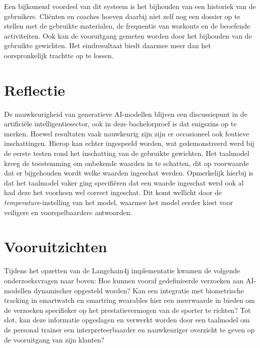 Een bijkomend voordeel van dit systeem is het bijhouden van een historiek van de gebruikers.
Cliënten en coaches hoeven daarbij niet zelf nog een dossier op te stellen met de gebruikte materialen, de frequentie van workouts en de beoefende activiteiten.
Ook kan de vooruitgang gemeten worden door het bijhouden van de gebruikte gewichten.
Het eindresultaat biedt daarmee meer dan het oorspronkelijk trachtte op te lossen.

\section{Reflectie}
\label{sec:reflectie}
De nauwkeurigheid van generatieve AI-modellen blijven een discussiepunt in de artificiële intelligentiesector, ook in deze bachelorproef is dat enigszins op te merken.
Hoewel resultaten vaak nauwkeurig zijn zijn er occasioneel ook foutieve inschattingen.
Hierop kan echter ingespeeld worden, wat gedemonstreerd werd bij de eerste testen rond het inschatting van de gebruikte gewichten.
Het taalmodel kreeg de toestemming om onbekende waarden in te schatten, dit op voorwaarde dat er bijgehouden wordt welke waarden ingeschat werden.
Opmerkelijk hierbij is dat het taalmodel vaker ging specifiëren dat een waarde ingeschat werd ook al had deze het voorheen wel correct ingeschat.
Dit komt wellicht door de \textit{temperature}-instelling van het model, waarmee het model eerder kiest voor veiligere en voorspelbaardere antwoorden.

\section{Vooruitzichten}
\label{sec:vooruitzichten}
Tijdens het opzetten van de Langchain4j implementatie kwamen de volgende onderzoeksvragen naar boven:
Hoe kunnen vooraf gedefinieerde verzoeken aan AI-modellen dynamischer opgesteld worden?
Kan een integratie met biometrische tracking in smartwatch en smartring wearables hier een meerwaarde in bieden om de verzoeken specifieker op het prestatievermogen van de sporter te richten?
Tot slot, kan deze informatie opgeslagen en verwerkt worden door een taalmodel om de personal trainer een interpreteerbaarder en nauwkeuriger overzicht te geven op de vooruitgang van zijn klanten?